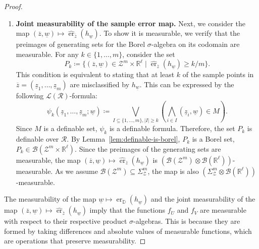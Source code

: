 \begin{proof}
\begin{enumerate}
        \item \textbf{Joint measurability of the sample error map.}
        Next, we consider the map $(\overline{z}, \underline{w}) \mapsto \hat{\operatorname{er}}_{\overline{z}}(h_{\underline{w}})$. To show it is measurable, we verify that the preimages of generating sets for the Borel $\sigma$-algebra on its codomain are measurable. For any $k \in \{1, \dots, m\}$, consider the set
        \[
            P_k \coloneqq \{(\overline{z}, \underline{w}) \in \mathcal{Z}^m \times \mathbb{R}^\ell \mid \hat{\operatorname{er}}_{\overline{z}}(h_{\underline{w}}) \ge k/m \}.
        \]
        This condition is equivalent to stating that at least $k$ of the sample points in $\overline{z} = (\underline{z}_1, \dots, \underline{z}_m)$ are misclassified by $h_{\underline{w}}$. This can be expressed by the following $\mathcal{L}(\mathcal{R})$-formula:
        \[
            \psi_k(\underline{z}_1, \dots, \underline{z}_m; \underline{w}) \coloneqq \bigvee_{I \subseteq \{1,\dots,m\}, |I| \ge k} \left( \bigwedge_{i \in I} (\underline{z}_i, \underline{w}) \in M \right).
        \]
        Since $M$ is a definable set, $\psi_k$ is a definable formula. Therefore, the set $P_k$ is definable over $\mathcal{R}$. By Lemma~\ref{lem:definable-is-borel}, $P_k$ is a Borel set, $P_k \in \mathcal{B}(\mathcal{Z}^m \times \mathbb{R}^\ell)$. Since the preimages of the generating sets are measurable, the map $(\overline{z}, \underline{w}) \mapsto \hat{\operatorname{er}}_{\overline{z}}(h_{\underline{w}})$ is $(\mathcal{B}(\mathcal{Z}^m) \otimes \mathcal{B}(\mathbb{R}^\ell))$-measurable. As we assume $\mathcal{B}(\mathcal{Z}^m) \subseteq \Sigma_{\mathcal{Z}}^m$, the map is also $(\Sigma_{\mathcal{Z}}^m \otimes \mathcal{B}(\mathbb{R}^\ell))$-measurable.
    \end{enumerate}

    The measurability of the map $\underline{w} \mapsto \operatorname{er}_{\mathbb{D}}(h_{\underline{w}})$ and the joint measurability of the map $(\overline{z}, \underline{w}) \mapsto \hat{\operatorname{er}}_{\overline{z}}(h_{\underline{w}})$ imply that the functions $f_U$ and $f_V$ are measurable with respect to their respective product $\sigma$-algebras. This is because they are formed by taking differences and absolute values of measurable functions, which are operations that preserve measurability.


\end{proof}
